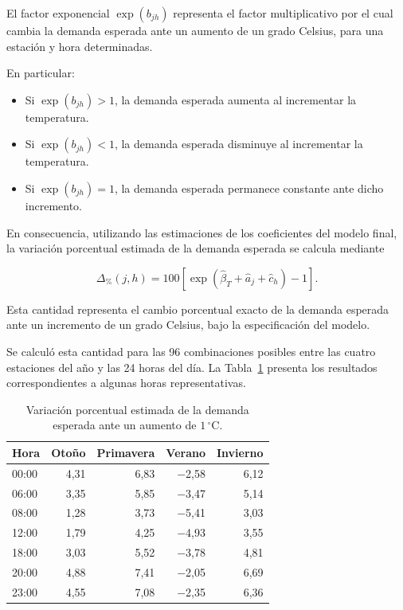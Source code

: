 \documentclass[12pt, a4paper]{article}
\numberwithin{equation}{section}
\begin{document}
El factor exponencial $\exp(b_{jh})$ representa el
factor multiplicativo por el cual cambia la demanda
esperada ante un aumento de un grado Celsius,
para una estación y hora determinadas.

En particular:

\begin{itemize}
    \item Si $\exp(b_{jh})>1$, la demanda esperada
    aumenta al incrementar la temperatura.

    \item Si $\exp(b_{jh})<1$, la demanda esperada
    disminuye al incrementar la temperatura.

    \item Si $\exp(b_{jh})=1$, la demanda esperada
    permanece constante ante dicho incremento.
\end{itemize}

En consecuencia, utilizando las estimaciones de los
coeficientes del modelo final, la variación porcentual
estimada de la demanda esperada se calcula mediante

\[
\Delta_{\%}(j,h)
=
100\left[
\exp(\widehat{\beta}_T+\widehat{a}_j+
\widehat{c}_h)-1
\right].
\]

Esta cantidad representa el cambio porcentual exacto
de la demanda esperada ante un incremento de un grado
Celsius, bajo la especificación del modelo.

Se calculó esta cantidad para las 96 combinaciones
posibles entre las cuatro estaciones del año y las
24 horas del día. La Tabla~\ref{tab:conclusion_temperatura}
presenta los resultados correspondientes a algunas
horas representativas.

\begin{table}[htbp]
\centering
\caption{Variación porcentual estimada de la demanda
esperada ante un aumento de $1\,^\circ$C.}
\label{tab:conclusion_temperatura}
\begin{tabular}{lrrrr}
\toprule
Hora & Otoño & Primavera & Verano & Invierno \\
\midrule
00:00 & 4{,}31 & 6{,}83 & $-$2{,}58 & 6{,}12 \\
06:00 & 3{,}35 & 5{,}85 & $-$3{,}47 & 5{,}14 \\
08:00 & 1{,}28 & 3{,}73 & $-$5{,}41 & 3{,}03 \\
12:00 & 1{,}79 & 4{,}25 & $-$4{,}93 & 3{,}55 \\
18:00 & 3{,}03 & 5{,}52 & $-$3{,}78 & 4{,}81 \\
20:00 & 4{,}88 & 7{,}41 & $-$2{,}05 & 6{,}69 \\
23:00 & 4{,}55 & 7{,}08 & $-$2{,}35 & 6{,}36 \\
\bottomrule
\end{tabular}
\end{table}
\newpage
\end{document}
